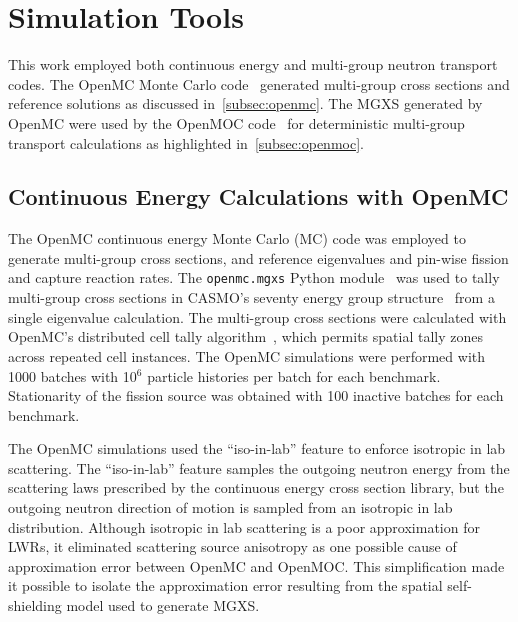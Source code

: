 \section{Simulation Tools}
\label{sec:simulation-tools}

This work employed both continuous energy and multi-group neutron transport codes. The OpenMC Monte Carlo code~\citep{romano2013openmc} generated multi-group cross sections and reference solutions as discussed in~\autoref{subsec:openmc}. The MGXS generated by OpenMC were used by the OpenMOC code~\citep{boyd2014openmoc} for deterministic multi-group transport calculations as highlighted in~\autoref{subsec:openmoc}.


\subsection{Continuous Energy Calculations with OpenMC}
\label{subsec:openmc}

The OpenMC continuous energy Monte Carlo (MC) code \citep{romano2013openmc} was employed to generate multi-group cross sections, and reference eigenvalues and pin-wise fission and capture reaction rates. The \texttt{openmc.mgxs} Python module~\citep{boyd2017openmcmgxs} was used to tally multi-group cross sections in CASMO's seventy energy group structure~\citep{rhodes2006casmo} from a single eigenvalue calculation. The multi-group cross sections were calculated with OpenMC's distributed cell tally algorithm~\citep{lax2014distribcell}, which permits spatial tally zones across repeated cell instances. The OpenMC simulations were performed with 1000 batches with 10$^{6}$ particle histories per batch for each benchmark. Stationarity of the fission source was obtained with 100 inactive batches for each benchmark.

The OpenMC simulations used the ``iso-in-lab'' feature to enforce isotropic in lab scattering. The ``iso-in-lab'' feature samples the outgoing neutron energy from the scattering laws prescribed by the continuous energy cross section library, but the outgoing neutron direction of motion is sampled from an isotropic in lab distribution. Although isotropic in lab scattering is a poor approximation for LWRs, it eliminated scattering source anisotropy as one possible cause of approximation error between OpenMC and OpenMOC. This simplification made it possible to isolate the approximation error resulting from the spatial self-shielding model used to generate MGXS.


